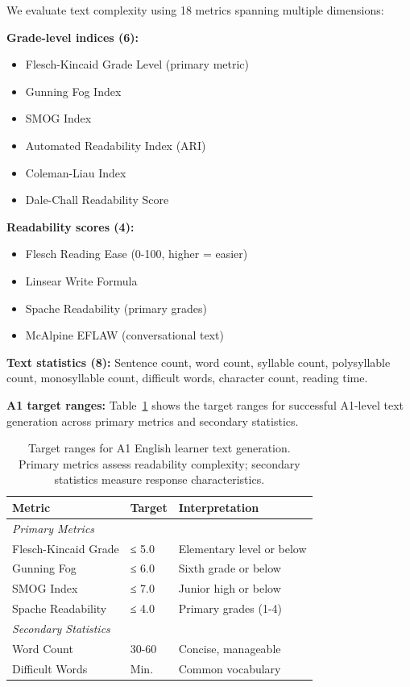 \documentclass[10pt, a4paper]{article}
\begin{document}
We evaluate text complexity using 18 metrics spanning multiple dimensions:

\textbf{Grade-level indices (6):}
\begin{itemize}
\item Flesch-Kincaid Grade Level (primary metric)
\item Gunning Fog Index
\item SMOG Index
\item Automated Readability Index (ARI)
\item Coleman-Liau Index
\item Dale-Chall Readability Score
\end{itemize}

\textbf{Readability scores (4):}
\begin{itemize}
\item Flesch Reading Ease (0-100, higher = easier)
\item Linsear Write Formula
\item Spache Readability (primary grades)
\item McAlpine EFLAW (conversational text)
\end{itemize}

\textbf{Text statistics (8):}
Sentence count, word count, syllable count, polysyllable count, monosyllable count, difficult words, character count, reading time.

\textbf{A1 target ranges:} Table~\ref{tab:a1-targets} shows the target ranges for successful A1-level text generation across primary metrics and secondary statistics.

\begin{table}
\centering
\small
\begin{tabular}{llp{4cm}}
\hline
\textbf{Metric} & \textbf{Target} & \textbf{Interpretation}\\
\hline
\multicolumn{3}{l}{\textit{Primary Metrics}} \\
Flesch-Kincaid Grade & ≤ 5.0 & Elementary level or below \\
Gunning Fog & ≤ 6.0 & Sixth grade or below \\
SMOG Index & ≤ 7.0 & Junior high or below \\
Spache Readability & ≤ 4.0 & Primary grades (1-4) \\
\hline
\multicolumn{3}{l}{\textit{Secondary Statistics}} \\
Word Count & 30-60 & Concise, manageable \\
Difficult Words & Min. & Common vocabulary \\
\hline
\end{tabular}
\caption{\label{tab:a1-targets} Target ranges for A1 English learner text generation. Primary metrics assess readability complexity; secondary statistics measure response characteristics.}
\end{table}
\end{document}
